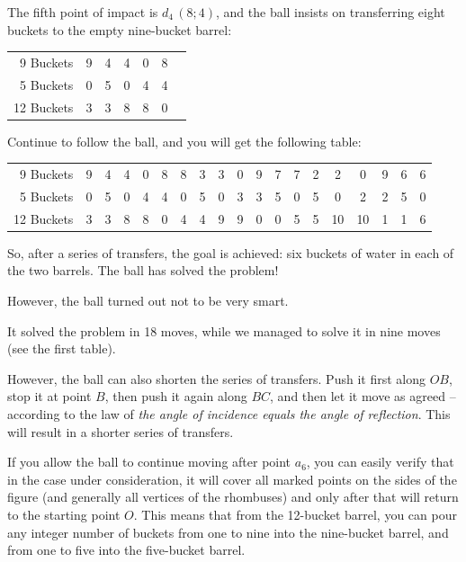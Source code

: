 The fifth point of impact is $d_{4}\, (8; 4)$, and the ball insists on transferring eight buckets to the empty nine-bucket barrel:

\begin{small}
\begin{center}
\begin{tabular}{@{}r *{6}{c}@{}}
\toprule
9 Buckets & 9  & 4 & 4 & 0 & 8 & \\
5 Buckets & 0 & 5 & 0 & 4 & 4 & \\
12 Buckets & 3 & 3 & 8 & 8 & 0 &\\ 
\bottomrule
\end{tabular}
\end{center}
\end{small}


Continue to follow the ball, and you will get the following table:

\begin{table}
\centering
\begin{small}
\begin{tabular}{@{}r *{18}{c}@{}}
\toprule
9 Buckets & 9  & 4 & 4 & 0 & 8 & 8 & 3 & 3 & 0& 9 & 7 & 7 & 2 & 2 & 0 & 9 & 6 & 6\\
5 Buckets & 0 & 5 & 0 & 4 & 4 & 0 & 5 & 0 & 3 & 3 & 5 & 0 & 5 & 0 & 2 & 2 & 5 & 0\\
12 Buckets & 3 & 3 & 8 & 8 & 0 & 4 & 4 & 9 & 9 & 0 & 0  & 5 & 5 & 10 & 10 & 1  & 1 & 6\\ 
\bottomrule
\end{tabular}
\end{small}
\end{table}

So, after a series of transfers, the goal is achieved: six buckets of water in each of the two barrels. The ball has solved the problem!


However, the ball turned out not to be very smart.

It solved the problem in 18 moves, while we managed to solve it in nine moves (see the first table).

However, the ball can also shorten the series of transfers. Push it first along $OB$, stop it at point $B$, then push it again along $BC$, and then let it move as agreed -- according to the law of \emph{the angle of incidence equals the angle of reflection}. This will result in a shorter series of transfers.

If you allow the ball to continue moving after point $a_{6}$, you can easily verify that in the case under consideration, it will cover all marked points on the sides of the figure (and generally all vertices of the rhombuses) and only after that will return to the starting point $O$. This means that from the 12-bucket barrel, you can pour any integer number of buckets from one to nine into the nine-bucket barrel, and from one to five into the five-bucket barrel.

